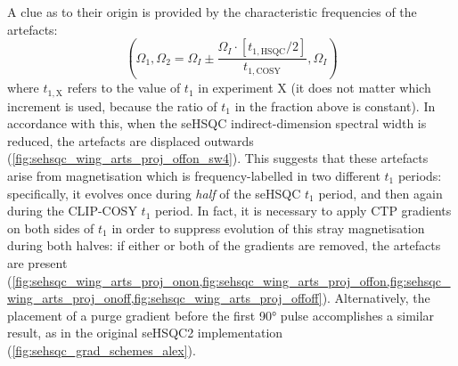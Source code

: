 A clue as to their origin is provided by the characteristic frequencies of the artefacts:
\begin{equation}
    \label{eq:wing_artefact_frequencies}
    \left(\Omega_1, \Omega_2 = \Omega_I \pm \frac{\Omega_I \cdot [t_{1,\text{HSQC}}/2]}{t_{1,\text{COSY}}}, \Omega_I\right)
\end{equation}
where $t_{1,\text{X}}$ refers to the value of $t_1$ in experiment X (it does not matter which increment is used, because the ratio of $t_1$ in the fraction above is constant).
In accordance with this, when the seHSQC indirect-dimension spectral width is reduced, the artefacts are displaced outwards (\cref{fig:sehsqc_wing_arts_proj_offon_sw4}).
This suggests that these artefacts arise from  magnetisation which is frequency-labelled in two different $t_1$ periods: specifically, it evolves once during \textit{half} of the seHSQC $t_1$ period, and then again during the CLIP-COSY $t_1$ period.
In fact, it is necessary to apply CTP gradients on both sides of $t_1$ in order to suppress evolution of this stray magnetisation during both halves: if either or both of the gradients are removed, the artefacts are present (\cref{fig:sehsqc_wing_arts_proj_onon,fig:sehsqc_wing_arts_proj_offon,fig:sehsqc_wing_arts_proj_onoff,fig:sehsqc_wing_arts_proj_offoff}).
Alternatively, the placement of a purge gradient before the first \carbon{} \ang{90} pulse accomplishes a similar result, as in the original seHSQC2 implementation (\cref{fig:sehsqc_grad_schemes_alex}).

